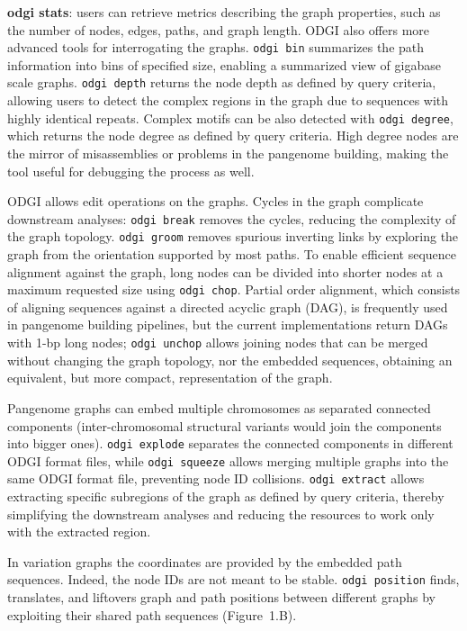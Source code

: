 \documentclass{bioinfo}
\newcommand{\cmdbf}[1]{{\textbf{#1}}}
\newcommand{\topic}[1]{{\cmdbf{#1}}:}
\begin{document}
    \topic{odgi stats} users can retrieve metrics describing the graph properties, such as the number of
    nodes, edges, paths, and graph length. ODGI also offers more advanced tools for interrogating the graphs.
    \texttt{odgi bin} summarizes the path information into bins of specified size, enabling a summarized view of
    gigabase scale graphs. \texttt{odgi depth} returns the node depth as defined by query criteria, allowing users to
    detect the complex regions in the graph due to sequences with highly identical repeats. Complex motifs can be also
    detected with \texttt{odgi degree}, which returns the node degree as defined by query criteria. High degree nodes
    are the mirror of misassemblies or problems in the pangenome building, making the tool useful for debugging the
    process as well.


    ODGI allows edit operations on the graphs. Cycles in the graph complicate downstream analyses: \texttt{odgi break}
    removes the cycles, reducing the complexity of the graph topology. \texttt{odgi groom} removes spurious inverting
    links by exploring the graph from the orientation supported by most paths. To enable efficient sequence alignment
    against the graph, long nodes can be divided into shorter nodes at a maximum requested size using
    \texttt{odgi chop}. Partial order alignment, which consists of aligning sequences against a directed acyclic graph
    (DAG), is frequently used in pangenome building pipelines, but the current implementations return DAGs with 1-bp
    long nodes; \texttt{odgi unchop} allows joining nodes that can be merged without changing the graph topology, nor
    the embedded sequences, obtaining an equivalent, but more compact, representation of the graph.

    Pangenome graphs can embed multiple chromosomes as separated connected components (inter-chromosomal structural
    variants would join the components into bigger ones). \texttt{odgi explode} separates the connected components in
    different ODGI format files, while \texttt{odgi squeeze} allows merging multiple graphs into the same ODGI format
    file, preventing node ID collisions. \texttt{odgi extract} allows extracting specific subregions of the graph as
    defined by query criteria, thereby simplifying the downstream analyses and reducing the resources to work only
    with the extracted region.

    In variation graphs the coordinates are provided by the embedded path sequences. Indeed, the node IDs are not
    meant to be stable. \texttt{odgi position} finds, translates, and liftovers graph and path positions between
    different graphs by exploiting their shared path sequences (Figure~1.B\vphantom{\ref{fig:01}}).
\end{document}
